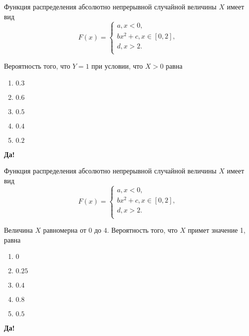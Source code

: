 \documentclass[t]{beamer}
\begin{document}
 \begin{frame} \label{17-Yes} 
\begin{block}{17} 

Функция распределения абсолютно непрерывной случайной величины $X$ имеет вид
\[
F(x)=\begin{cases}
a, x<0,\\
b x^2+c, x \in [0,2],\\
d, x > 2.\\
\end{cases}
\]
\vspace{0.2cm} 
 
 Вероятность того, что $Y = 1$ при условии, что $X > 0$ равна
 


 \end{block} 
\begin{enumerate} 
\item[] \hyperlink{17-No}{\beamergotobutton{} $0.3$}
\item[] \hyperlink{17-Yes}{\beamergotobutton{} $0.6$}
\item[] \hyperlink{17-No}{\beamergotobutton{} $0.5$}
\item[] \hyperlink{17-No}{\beamergotobutton{} $0.4$
}
\item[] \hyperlink{17-No}{\beamergotobutton{} $0.2$}
\end{enumerate} 

 \textbf{Да!} 
 \hyperlink{18}{}\end{frame} 


 \begin{frame} \label{18-Yes} 
\begin{block}{18} 

Функция распределения абсолютно непрерывной случайной величины $X$ имеет вид
\[
F(x)=\begin{cases}
a, x<0,\\
b x^2+c, x \in [0,2],\\
d, x > 2.\\
\end{cases}
\]
\vspace{0.2cm} 
 
 Величина $X$ равномерна от $0$ до $4$. Вероятность того, что $X$ примет значение 1, равна
 


 \end{block} 
\begin{enumerate} 
\item[] \hyperlink{18-Yes}{\beamergotobutton{} $0$}
\item[] \hyperlink{18-No}{\beamergotobutton{} $0.25$}
\item[] \hyperlink{18-No}{\beamergotobutton{} $0.4$}
\item[] \hyperlink{18-No}{\beamergotobutton{} $0.8$
}
\item[] \hyperlink{18-No}{\beamergotobutton{} $0.5$}
\end{enumerate} 

 \textbf{Да!} 
 \hyperlink{19}{}\end{frame} 
\end{document}
